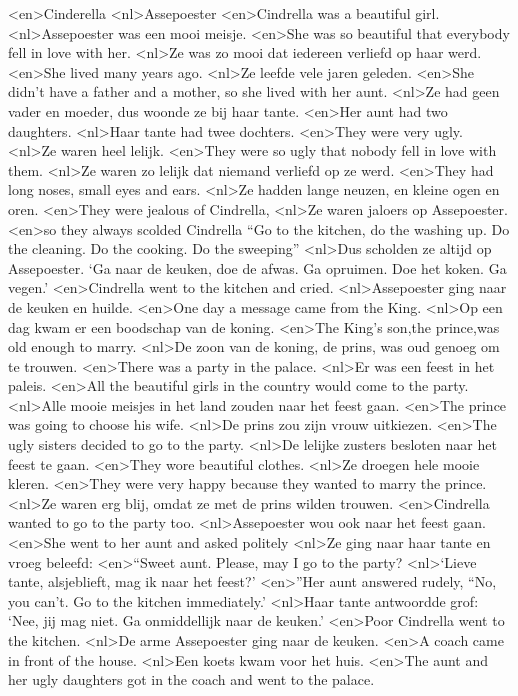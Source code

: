 <en>Cinderella
<nl>Assepoester
<en>Cindrella was a beautiful girl.
<nl>Assepoester was een mooi meisje.
<en>She was so beautiful that everybody fell in love with her.
<nl>Ze was zo mooi dat iedereen verliefd op haar werd.
<en>She lived many years ago.
<nl>Ze leefde vele jaren geleden.
<en>She  didn’t have a father and a mother, so she lived with her aunt.
<nl>Ze had geen vader en moeder, dus woonde ze bij haar tante.
<en>Her aunt  had two daughters.
<nl>Haar tante had twee dochters.
<en>They were very ugly.
<nl>Ze waren heel lelijk.
<en>They were so ugly that nobody fell in love with them.
<nl>Ze waren zo lelijk dat niemand verliefd op ze werd.
<en>They had long noses, small eyes and ears.
<nl>Ze hadden lange neuzen, en kleine ogen en oren.
<en>They were jealous of Cindrella,
<nl>Ze waren jaloers op Assepoester.
<en>so they always scolded Cindrella “Go to the kitchen, do the washing up. Do the cleaning. Do the cooking. Do the sweeping”
<nl>Dus scholden ze altijd op Assepoester. `Ga naar de keuken, doe de afwas. Ga opruimen. Doe het koken. Ga vegen.'
<en>Cindrella went to the kitchen and cried.
<nl>Assepoester ging naar de keuken en huilde.
<en>One day a message came from the King.
<nl>Op een dag kwam er een boodschap van de koning. 
<en>The King’s son,the prince,was old enough to marry.
<nl>De zoon van de koning, de prins, was oud genoeg om te trouwen.
<en>There was a party in the palace.
<nl>Er was een feest in het paleis.
<en>All the beautiful girls in the country would come to the party.
<nl>Alle mooie meisjes in het land zouden naar het feest gaan.
<en>The prince was going to choose his wife.
<nl>De prins zou zijn vrouw uitkiezen.
<en>The ugly sisters decided to go to the party.
<nl>De lelijke zusters besloten naar het feest te gaan.
<en>They wore beautiful clothes.
<nl>Ze droegen hele mooie kleren.
<en>They were very happy because they wanted to marry the prince.
<nl>Ze waren erg blij, omdat ze met de prins wilden trouwen.
<en>Cindrella wanted to go to the party too.
<nl>Assepoester wou ook naar het feest gaan.
<en>She went to her aunt and asked politely
<nl>Ze ging naar haar tante en vroeg beleefd:
<en>“Sweet aunt. Please, may I go to the party?
<nl>`Lieve tante, alsjeblieft, mag ik naar het feest?'
<en>”Her aunt answered rudely, “No, you can’t. Go to the kitchen  immediately.'
<nl>Haar tante antwoordde grof: `Nee, jij mag niet. Ga onmiddellijk naar de keuken.'
<en>Poor Cindrella went to the kitchen.
<nl>De arme Assepoester ging naar de keuken.
<en>A coach came in front of the house.
<nl>Een koets kwam voor het huis.
<en>The aunt and her ugly daughters got in the  coach and went to the palace.
